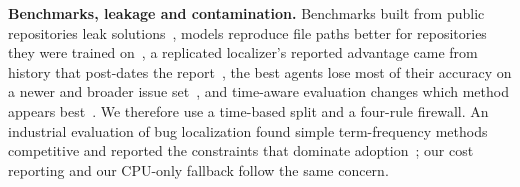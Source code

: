\textbf{Benchmarks, leakage and contamination.} Benchmarks built from
public repositories leak solutions~\cite{aleithan2024swebenchplus},
models reproduce file paths better for repositories they were trained
on~\cite{liang2025illusion}, a replicated localizer's reported advantage
came from history that post-dates the report~\cite{niu2026ablots}, the
best agents lose most of their accuracy on a newer and broader issue
set~\cite{zhang2025mulocbench}, and time-aware evaluation changes
which method appears best~\cite{ledel2021broccoli}. We therefore use a
time-based split and a four-rule firewall. An industrial evaluation of
bug localization found simple term-frequency methods competitive and
reported the constraints that dominate adoption~\cite{hall2026industrial};
our cost reporting and our CPU-only fallback follow the same concern.
